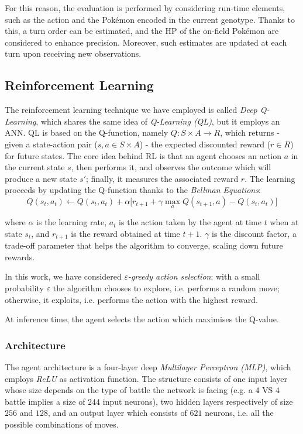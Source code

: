 For this reason, the evaluation is performed by considering run-time elements, such as the action and the Pokémon encoded in the current genotype. Thanks to this, a turn order can be estimated, and the HP of the on-field Pokémon are considered to enhance precision. Moreover, such estimates are updated at each turn upon receiving new observations.

\subsection{Reinforcement Learning}
The reinforcement learning technique we have employed is called \emph{Deep Q-Learning}, which shares the same idea of \emph{Q-Learning (QL)}, but it employs an ANN. QL is based on the Q-function, namely $Q : S \times A \rightarrow R$, which returns - given a state-action pair ($s, a \in S \times A$) - the expected discounted reward ($r \in R$) for future states. The core idea behind RL is that an agent chooses an action $a$ in the current state $s$, then performs it, and observes the outcome which will produce a new state $s'$; finally, it measures the associated reward $r$. The learning proceeds by updating the Q-function thanks to the \emph{Bellman Equations}:
\begin{equation*}
    Q(s_t, a_t) \leftarrow Q(s_t, a_t) + \alpha \Big[ r_{t + 1} + \gamma \max_{a} Q(s_{t + 1}, a) - Q(s_t, a_t)\Big]
\end{equation*}

where $\alpha$ is the learning rate, $a_t$ is the action taken by the agent at time $t$ when at state $s_t$, and $r_{t + 1}$ is the reward obtained at time $t + 1$. $\gamma$ is the discount factor, a trade-off parameter that helps the algorithm to converge, scaling down future rewards.

In this work, we have considered \emph{$\varepsilon$-greedy action selection}: with a small probability $\varepsilon$ the algorithm chooses to explore, i.e. performs a random move; otherwise, it exploits, i.e. performs the action with the highest reward.

At inference time, the agent selects the action which maximises the Q-value.

\subsubsection{Architecture}
The agent architecture is a four-layer deep \emph{Multilayer Perceptron (MLP)}, which employs \emph{ReLU} as activation function. The structure consists of one input layer whose size depends on the type of battle the network is facing (e.g. a $4 \text{ VS } 4$ battle implies a size of $244$ input neurons), two hidden layers respectively of size $256$ and $128$, and an output layer which consists of $621$ neurons, i.e. all the possible combinations of moves.

